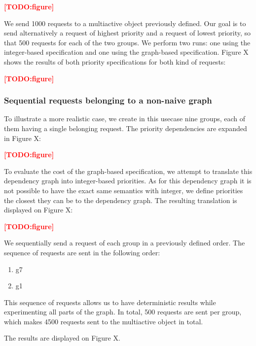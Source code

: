 \documentclass[11pt]{report}
\newcommand{\TODO}[1]{\textcolor{red}{\textbf{[TODO:#1]}}}
\begin{document}
\TODO{figure}



We send 1000 requests to a multiactive object previously defined. Our goal is to send alternatively a request of highest priority and a request of lowest priority, so that 500 requests for each of the two groups. We perform two runs: one using the integer-based specification and one using the graph-based specification. Figure X shows the results of both priority specifications for both kind of requests:

\TODO{figure}




\subsubsection{Sequential requests belonging to a non-naive graph}
To illustrate a more realistic case, we create in this usecase nine groups, each of them having a single belonging request. The priority dependencies are expanded in Figure X:

\TODO{figure}

To evaluate the cost of the graph-based specification, we attempt to translate this dependency graph into integer-based priorities. As for this dependency graph it is not possible to have the exact same semantics with integer, we define priorities the closest they can be to the dependency graph. The resulting translation is displayed on Figure X:

\TODO{figure}

We sequentially send a request of each group in a previously defined order. The sequence of requests are sent in the following order:
\begin{enumerate}
\item g7
\item g1
\end{enumerate}
This sequence of requests allows us to have deterministic results while experimenting all parts of the graph. In total, 500 requests are sent per group, which makes 4500 requests sent to the multiactive object in total.

The results are displayed on Figure X.
\end{document}
